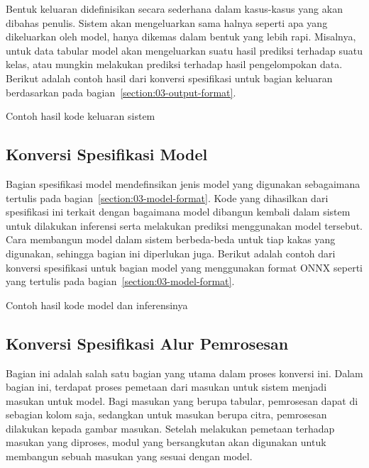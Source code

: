 Bentuk keluaran didefinisikan secara sederhana dalam kasus-kasus yang akan dibahas penulis.
Sistem akan mengeluarkan sama halnya seperti apa yang dikeluarkan oleh model, hanya dikemas dalam bentuk yang lebih rapi.
Misalnya, untuk data tabular model akan mengeluarkan suatu hasil prediksi terhadap suatu kelas, atau mungkin melakukan prediksi terhadap hasil pengelompokan data.
Berikut adalah contoh hasil dari konversi spesifikasi untuk bagian keluaran berdasarkan pada bagian~\ref{section:03-output-format}.

\begin{code}
	\caption{Contoh hasil kode keluaran sistem}
	\label{listing:11}
\end{code}

\subsection{Konversi Spesifikasi Model}

Bagian spesifikasi model mendefinsikan jenis model yang digunakan sebagaimana tertulis pada bagian~\ref{section:03-model-format}.
Kode yang dihasilkan dari spesifikasi ini terkait dengan bagaimana model dibangun kembali dalam sistem untuk dilakukan inferensi serta melakukan prediksi menggunakan model tersebut.
Cara membangun model dalam sistem berbeda-beda untuk tiap kakas yang digunakan, sehingga bagian ini diperlukan juga.
Berikut adalah contoh dari konversi spesifikasi untuk bagian model yang menggunakan format ONNX seperti yang tertulis pada bagian~\ref{section:03-model-format}.

\begin{code}
	\caption{Contoh hasil kode model dan inferensinya}
	\label{listing:12}
\end{code}

\subsection{Konversi Spesifikasi Alur Pemrosesan}

Bagian ini adalah salah satu bagian yang utama dalam proses konversi ini.
Dalam bagian ini, terdapat proses pemetaan dari masukan untuk sistem menjadi masukan untuk model.
Bagi masukan yang berupa tabular, pemrosesan dapat di sebagian kolom saja, sedangkan untuk masukan berupa citra, pemrosesan dilakukan kepada gambar masukan.
Setelah melakukan pemetaan terhadap masukan yang diproses, modul yang bersangkutan akan digunakan untuk membangun sebuah masukan yang sesuai dengan model.

